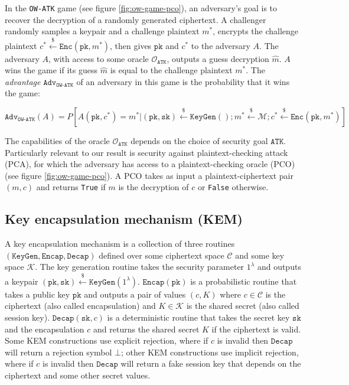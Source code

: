 \documentclass[journal=tches,submission]{iacrtrans}
\newcommand{\keygen}{\texttt{KeyGen}}
\newcommand{\encrypt}{\texttt{Enc}}
\newcommand{\encap}{\texttt{Encap}}
\newcommand{\decap}{\texttt{Decap}}
\newcommand{\pk}{\texttt{pk}}
\newcommand{\sk}{\texttt{sk}}
\newcommand{\leftsample}{\stackrel{\$}{\leftarrow}}
\newcommand{\adv}{\texttt{Adv}}
\begin{document}
In the \texttt{OW-ATK} game (see figure \ref{fig:ow-game-pco}), an adversary's goal is to recover the decryption of a randomly generated ciphertext. A challenger randomly samples a keypair and a challenge plaintext $m^\ast$, encrypts the challenge plaintext $c^\ast \leftsample \encrypt(\pk, m^\ast)$, then gives $\pk$ and $c^\ast$ to the adversary $A$. The adversary $A$, with access to some oracle $\mathcal{O}_\texttt{ATK}$, outputs a guess decryption $\hat{m}$. $A$ wins the game if its guess $\hat{m}$ is equal to the challenge plaintext $m^\ast$. The \textit{advantage} $\adv_\texttt{OW-ATK}$ of an adversary in this game is the probability that it wins the game:

\begin{equation*}
    \adv_\texttt{OW-ATK}(A) = P\left[
        A(\pk, c^\ast) = m^\ast \vert
        (\pk, \sk) \leftsample \keygen() ;
        m^\ast \leftsample \mathcal{M};
        c^\ast \leftsample \encrypt(\pk, m^\ast)
    \right]
\end{equation*}

The capabilities of the oracle $\mathcal{O}_\texttt{ATK}$ depends on the choice of security goal $\texttt{ATK}$. Particularly relevant to our result is security against plaintext-checking attack (PCA), for which the adversary has access to a plaintext-checking oracle (PCO) (see figure \ref{fig:ow-game-pco}). A PCO takes as input a plaintext-ciphertext pair $(m, c)$ and returns \texttt{True} if $m$ is the decryption of $c$ or \texttt{False} otherwise.

\subsection{Key encapsulation mechanism (KEM)}
A key encapsulation mechanism is a collection of three routines $(\keygen, \encap, \decap)$ defined over some ciphertext space $\mathcal{C}$ and some key space $\mathcal{K}$. The key generation routine takes the security parameter $1^\lambda$ and outputs a keypair $(\pk, \sk) \leftsample \keygen(1^\lambda)$. $\encap(\pk)$ is a probabilistic routine that takes a public key $\pk$ and outputs a pair of values $(c, K)$ where $c \in \mathcal{C}$ is the ciphertext (also called encapsulation) and $K \in \mathcal{K}$ is the shared secret (also called session key). $\decap(\sk, c)$ is a deterministic routine that takes the secret key $\sk$ and the encapsulation $c$ and returns the shared secret $K$ if the ciphertext is valid. Some KEM constructions use explicit rejection, where if $c$ is invalid then $\decap$ will return a rejection symbol $\bot$; other KEM constructions use implicit rejection, where if $c$ is invalid then $\decap$ will return a fake session key that depends on the ciphertext and some other secret values.
\end{document}
